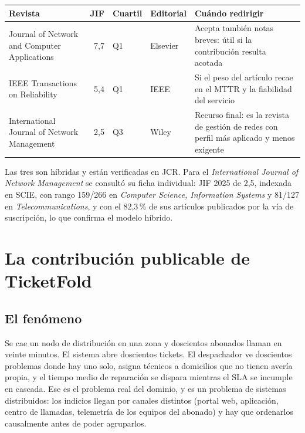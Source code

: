 \documentclass[11pt,a4paper]{article}
\begin{document}
\begin{center}
	\small
	\begin{tabular}{@{}p{5.2cm}rp{1.5cm}p{2.0cm}p{4.5cm}@{}}
		\toprule
		\textbf{Revista} & \textbf{JIF} & \textbf{Cuartil} & \textbf{Editorial} & \textbf{Cuándo redirigir} \\
		\midrule
		Journal of Network and Computer Applications & 7,7 & Q1 & Elsevier & Acepta también notas breves: útil si la contribución resulta acotada \\
		\addlinespace
		IEEE Transactions on Reliability & 5,4 & Q1 & IEEE & Si el peso del artículo recae en el MTTR y la fiabilidad del servicio \\
		\addlinespace
		International Journal of Network Management & 2,5 & Q3 & Wiley & Recurso final: es la revista de gestión de redes con perfil más aplicado y menos exigente \\
		\bottomrule
	\end{tabular}
\end{center}



Las tres son híbridas y están verificadas en JCR. Para el \emph{International Journal of Network Management} se consultó su ficha individual: JIF 2025 de 2,5, indexada en SCIE, con rango 159/266 en \emph{Computer Science, Information Systems} y 81/127 en \emph{Telecommunications}, y con el 82,3\,\% de sus artículos publicados por la vía de suscripción, lo que confirma el modelo híbrido.

\section{La contribución publicable de TicketFold}

\subsection{El fenómeno}

Se cae un nodo de distribución en una zona y doscientos abonados llaman en veinte minutos. El sistema abre doscientos tickets. El despachador ve doscientos problemas donde hay uno solo, asigna técnicos a domicilios que no tienen avería propia, y el tiempo medio de reparación se dispara mientras el SLA se incumple en cascada. Ese es el problema real del dominio, y es un problema de sistemas distribuidos: los indicios llegan por canales distintos (portal web, aplicación, centro de llamadas, telemetría de los equipos del abonado) y hay que ordenarlos causalmente antes de poder agruparlos.
\end{document}
